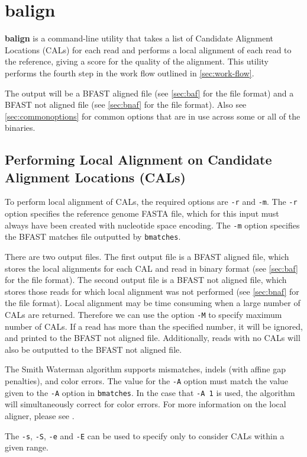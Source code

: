 \documentclass[a4paper,12pt]{book}
\newcommand{\TT}[1]{{\tt #1}} %
\newcommand{\BF}[1]{{\bf #1}} %
\newcommand{\rGFF}{reference genome FASTA file}
\newcommand{\BMF}{BFAST matches file} %
\newcommand{\BAF}{BFAST aligned file} %
\newcommand{\BNAF}{BFAST not aligned file} %
\begin{document}
\section{balign}
\label{sec:balign}
\BF{balign} is a command-line utility that takes a list of Candidate Alignment Locations (CALs) for each read and performs a local alignment of each read to the reference, giving a score for the quality of the alignment.
This utility performs the fourth step in the work flow outlined in \autoref{sec:work-flow}.

The output will be a \BAF{} (see \autoref{sec:baf} for the file format) and a \BNAF{} (see \autoref{sec:bnaf} for the file format).
Also see \autoref{sec:commonoptions} for common options that are in use across some or all of the binaries.

\subsection{Performing Local Alignment on Candidate Alignment Locations (CALs)}
\label{sec:local-alignment}
To perform local alignment of CALs, the required options are \TT{-r} and \TT{-m}.
The \TT{-r} option specifies the \rGFF{}, which for this input must always have been created with nucleotide space encoding.
The \TT{-m} option specifies the \BMF{} outputted by \TT{bmatches}.

There are two output files.
The first output file is a \BAF{}, which stores the local alignments for each CAL and read in binary format (see \autoref{sec:baf} for the file format).
The second output file is a \BNAF{}, which stores those reads for which local alignment was not performed (see \autoref{sec:bnaf} for the file format).
Local alignment may be time consuming when a large number of CALs are returned.
Therefore we can use the option \TT{-M} to specify maximum number of CALs.
If a read has more than the specified number, it will be ignored, and printed to the \BNAF{}.
Additionally, reads with no CALs will also be outputted to the \BNAF{}. 

The Smith Waterman algorithm supports mismatches, indels (with affine gap penalties), and color errors.
The value for the \TT{-A} option must match the value given to the \TT{-A} option in \TT{bmatches}.
In the case that \TT{-A 1} is used, the algorithm will simultaneously correct for color errors.
For more information on the local aligner, please see \cite{BFAST-local-alignment}.

The \TT{-s}, \TT{-S}, \TT{-e} and \TT{-E} can be used to specify only to consider CALs within a given range.
\end{document}
